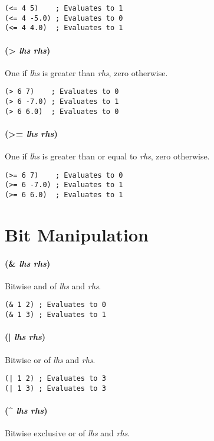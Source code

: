 \documentclass[numbers=noenddot]{scrbook}
\begin{document}
\begin{verbatim}
(<= 4 5)    ; Evaluates to 1
(<= 4 -5.0) ; Evaluates to 0
(<= 4 4.0)  ; Evaluates to 1
\end{verbatim}

\paragraph{(> \emph{lhs} \emph{rhs})}
One if \emph{lhs} is greater than \emph{rhs}, zero otherwise.

\begin{verbatim}
(> 6 7)    ; Evaluates to 0
(> 6 -7.0) ; Evaluates to 1
(> 6 6.0)  ; Evaluates to 0
\end{verbatim}

\paragraph{(>= \emph{lhs} \emph{rhs})}
One if \emph{lhs} is greater than or equal to \emph{rhs}, zero otherwise.

\begin{verbatim}
(>= 6 7)    ; Evaluates to 0
(>= 6 -7.0) ; Evaluates to 1
(>= 6 6.0)  ; Evaluates to 1
\end{verbatim}

\section{Bit Manipulation}
\paragraph{(\& \emph{lhs} \emph{rhs})}
Bitwise and of \emph{lhs} and \emph{rhs}.

\begin{verbatim}
(& 1 2) ; Evaluates to 0
(& 1 3) ; Evaluates to 1
\end{verbatim}

\paragraph{(| \emph{lhs} \emph{rhs})}
Bitwise or of \emph{lhs} and \emph{rhs}.

\begin{verbatim}
(| 1 2) ; Evaluates to 3
(| 1 3) ; Evaluates to 3
\end{verbatim}

\paragraph{(\^{} \emph{lhs} \emph{rhs})}
Bitwise exclusive or of \emph{lhs} and \emph{rhs}.
\end{document}
